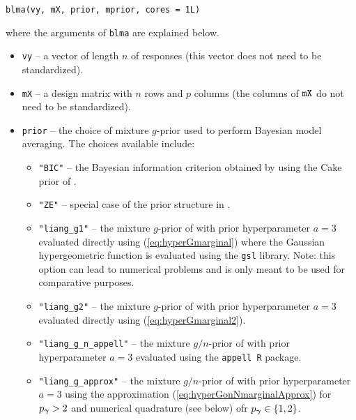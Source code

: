 \begin{verbatim}
blma(vy, mX, prior, mprior, cores = 1L)
\end{verbatim}

\noindent where the arguments of {\tt blma}
are explained below.
\begin{itemize}
    \item {\tt vy} -- a vector of length $n$ of responses (this vector does not
        need to be standardized).
	
    \item {\tt mX} -- a design matrix with $n$ rows and $p$ columns (the
        columns of ${\tt mX}$ do not need to be standardized).
	
    \item {\tt prior} -- the choice of mixture $g$-prior used to perform
        Bayesian model averaging. The choices available include:
	\begin{itemize}
        \item {\tt "BIC"} -- the Bayesian information criterion obtained by
            using the Cake prior of \cite{OrmerodEtal2017}. 
		
        \item {\tt "ZE"} -- special case of the prior structure in
            \cite{Maruyama2011}.
		
        \item {\tt "liang\_g1"} -- the mixture $g$-prior of \cite{Liang2008}
            with prior hyperparameter $a=3$ evaluated directly using
            (\ref{eq:hyperGmarginal}) where the Gaussian hypergeometric
            function is evaluated using the {\tt gsl} library. Note: this
            option can lead to numerical problems and is only meant to be used
            for comparative purposes.
		
        \item {\tt "liang\_g2"} -- the mixture $g$-prior of \cite{Liang2008}
            with prior hyperparameter $a=3$ evaluated directly using
            (\ref{eq:hyperGmarginal2}).
		
        \item {\tt "liang\_g\_n\_appell"} -- the mixture $g/n$-prior of
            \cite{Liang2008} with prior hyperparameter $a=3$ evaluated using
            the {\tt appell R} package.
		
        \item {\tt "liang\_g\_approx"} -- the mixture $g/n$-prior of
            \cite{Liang2008} with prior hyperparameter $a=3$ using the
            approximation (\ref{eq:hyperGonNmarginalApprox}) for $p_{\boldsymbol \gamma} >2$
            and numerical quadrature (see below) ofr $p_{\boldsymbol \gamma}\in \{1,2\}$.
		

\end{itemize}
\end{itemize}
